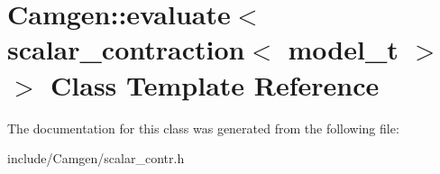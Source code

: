 \hypertarget{a00187}{\section{Camgen\-:\-:evaluate$<$ scalar\-\_\-contraction$<$ model\-\_\-t $>$ $>$ Class Template Reference}
\label{a00187}
}


The documentation for this class was generated from the following file\-:\begin{DoxyCompactItemize}
\item 
include/\-Camgen/scalar\-\_\-contr.\-h\end{DoxyCompactItemize}
